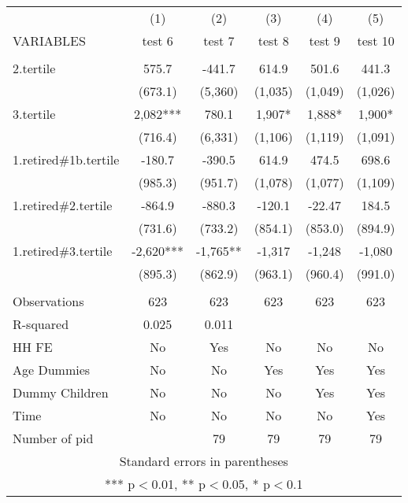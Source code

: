 \begin{tabular}{lccccc} \hline
 & (1) & (2) & (3) & (4) & (5) \\
VARIABLES & test 6 & test 7 & test 8 & test 9 & test 10 \\ \hline
 &  &  &  &  &  \\
2.tertile & 575.7 & -441.7 & 614.9 & 501.6 & 441.3 \\
 & (673.1) & (5,360) & (1,035) & (1,049) & (1,026) \\
3.tertile & 2,082*** & 780.1 & 1,907* & 1,888* & 1,900* \\
 & (716.4) & (6,331) & (1,106) & (1,119) & (1,091) \\
1.retired\#1b.tertile & -180.7 & -390.5 & 614.9 & 474.5 & 698.6 \\
 & (985.3) & (951.7) & (1,078) & (1,077) & (1,109) \\
1.retired\#2.tertile & -864.9 & -880.3 & -120.1 & -22.47 & 184.5 \\
 & (731.6) & (733.2) & (854.1) & (853.0) & (894.9) \\
1.retired\#3.tertile & -2,620*** & -1,765** & -1,317 & -1,248 & -1,080 \\
 & (895.3) & (862.9) & (963.1) & (960.4) & (991.0) \\
 &  &  &  &  &  \\
Observations & 623 & 623 & 623 & 623 & 623 \\
R-squared & 0.025 & 0.011 &  &  &  \\
HH FE & No & Yes & No & No & No \\
Age Dummies & No & No & Yes & Yes & Yes \\
Dummy Children & No & No & No & Yes & Yes \\
Time & No & No & No & No & Yes \\
 Number of pid &  & 79 & 79 & 79 & 79 \\ \hline
\multicolumn{6}{c}{ Standard errors in parentheses} \\
\multicolumn{6}{c}{ *** p$<$0.01, ** p$<$0.05, * p$<$0.1} \\
\end{tabular}

